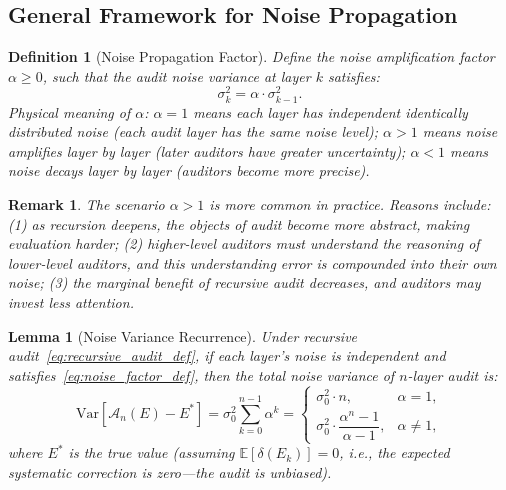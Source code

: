 \documentclass[12pt,a4paper]{article}
\newtheorem{lemma}[theorem]{Lemma}
\newtheorem{definition}[theorem]{Definition}
\newtheorem{remark}[theorem]{Remark}
\theoremstyle{definition}
\newcommand{\E}{\mathbb{E}}
\newcommand{\Var}{\mathrm{Var}}
\newcommand{\AuditOp}{\mathcal{A}}
\begin{document}
\subsection{General Framework for Noise Propagation}

\begin{definition}[Noise Propagation Factor]\label{def:noise_factor}
Define the noise amplification factor $\alpha \geq 0$, such that the audit noise variance at layer $k$ satisfies:
\begin{equation}\label{eq:noise_factor_def}
    \sigma_k^2 = \alpha \cdot \sigma_{k-1}^2.
\end{equation}
Physical meaning of $\alpha$: $\alpha = 1$ means each layer has independent identically distributed noise (each audit layer has the same noise level); $\alpha > 1$ means noise amplifies layer by layer (later auditors have greater uncertainty); $\alpha < 1$ means noise decays layer by layer (auditors become more precise).
\end{definition}

\begin{remark}
The scenario $\alpha > 1$ is more common in practice. Reasons include: (1) as recursion deepens, the objects of audit become more abstract, making evaluation harder; (2) higher-level auditors must understand the reasoning of lower-level auditors, and this understanding error is compounded into their own noise; (3) the marginal benefit of recursive audit decreases, and auditors may invest less attention.
\end{remark}

\begin{lemma}[Noise Variance Recurrence]\label{lem:variance_recurrence}
Under recursive audit~\eqref{eq:recursive_audit_def}, if each layer's noise is independent and satisfies~\eqref{eq:noise_factor_def}, then the total noise variance of $n$-layer audit is:
\begin{equation}\label{eq:total_variance}
    \Var[\AuditOp_n(E) - E^*] = \sigma_0^2 \sum_{k=0}^{n-1} \alpha^k =
    \begin{cases}
        \sigma_0^2 \cdot n, & \alpha = 1,\\[4pt]
        \sigma_0^2 \cdot \dfrac{\alpha^n - 1}{\alpha - 1}, & \alpha \neq 1,
    \end{cases}
\end{equation}
where $E^*$ is the true value (assuming $\E[\delta(E_k)] = 0$, i.e., the expected systematic correction is zero---the audit is unbiased).
\end{lemma}
\end{document}
